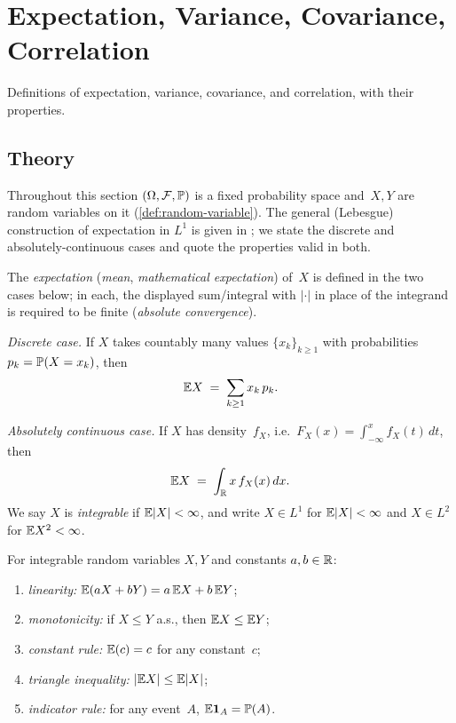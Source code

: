 
\section{Expectation, Variance, Covariance, Correlation}
\label{sec:1.2.03-moments}

\begin{ticket}
Definitions of expectation, variance, covariance, and correlation, with their properties.
\end{ticket}

\subsection*{Theory}

Throughout this section $(\Omega, \mathcal{F}, \mathbb{P})$ is a fixed
probability space and~$X, Y$ are random variables on it
(\cref{def:random-variable}). The general (Lebesgue) construction of
expectation in $L^1$ is given in \cite[Ch.~II, \S~6]{Shiryaev1989}; we
state the discrete and absolutely-continuous cases and quote the
properties valid in both.

\begin{definition}[Expectation]
\label{def:expectation}
The \emph{expectation} (\emph{mean}, \emph{mathematical expectation})
of~$X$ is defined in the two cases below; in each, the displayed
sum/integral with $|\cdot|$ in place of the integrand is required to
be finite (\emph{absolute convergence}).

\emph{Discrete case.} If $X$ takes countably many values
$\{x_k\}_{k \geq 1}$ with probabilities $p_k = \mathbb{P}(X = x_k)$, then
\[
  \mathbb{E} X \;=\; \sum_{k \geq 1} x_k\, p_k.
\]

\emph{Absolutely continuous case.} If $X$ has density~$f_X$, i.e.\
$F_X(x) = \int_{-\infty}^{x} f_X(t)\, dt$, then
\[
  \mathbb{E} X \;=\; \int_{\mathbb{R}} x\, f_X(x)\, dx.
\]
We say $X$ is \emph{integrable} if $\mathbb{E} |X| < \infty$, and write
$X \in L^1$ for $\mathbb{E} |X| < \infty$ and $X \in L^2$ for $\mathbb{E} X^2 < \infty$.
\end{definition}

\begin{proposition}
\label{prop:exp-properties}
For integrable random variables $X, Y$ and constants $a, b \in \mathbb{R}$:
\begin{enumerate}[label=(\alph*)]
  \item \emph{linearity:} $\mathbb{E}(aX + bY) = a\, \mathbb{E} X + b\, \mathbb{E} Y$;
  \item \emph{monotonicity:} if $X \leq Y$ a.s., then $\mathbb{E} X \leq \mathbb{E} Y$;
  \item \emph{constant rule:} $\mathbb{E}(c) = c$ for any constant~$c$;
  \item \emph{triangle inequality:} $|\mathbb{E} X| \leq \mathbb{E} |X|$;
  \item \emph{indicator rule:} for any event~$A$, $\mathbb{E}\mathbf{1}_A = \mathbb{P}(A)$.
\end{enumerate}
\end{proposition}

